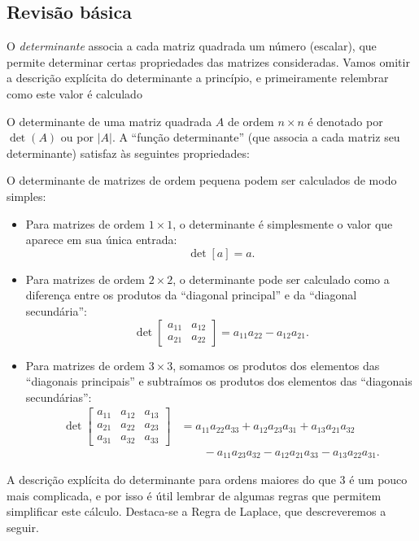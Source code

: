\subsection*{Revisão básica}

O \textit{determinante} associa a cada matriz quadrada um número (escalar), que permite determinar certas propriedades das matrizes consideradas. Vamos omitir a descrição explícita do determinante a princípio, e primeiramente relembrar como este valor é calculado

O determinante de uma matriz quadrada $A$ de ordem $n\times n$ é denotado por $\det(A)$ ou por $|A|$. A ``função determinante'' (que associa a cada matriz seu determinante) satisfaz às seguintes propriedades:

O determinante de matrizes de ordem pequena podem ser calculados de modo simples:

\begin{itemize}
	\item Para matrizes de ordem $1\times 1$, o determinante é simplesmente o valor que aparece em sua única entrada:
		\[\det[a]=a.\]
	\item Para matrizes de ordem $2\times 2$, o determinante pode ser calculado como a diferença entre os produtos da ``diagonal principal'' e da ``diagonal secundária'':
		\[\det\begin{bmatrix}
		a_{11}	& a_{12}\\a_{21}&a_{22}\end{bmatrix}=a_{11}a_{22}-a_{12}a_{21}.\]
	\item Para matrizes de ordem $3\times 3$, somamos os produtos dos elementos das ``diagonais principais'' e subtraímos os produtos dos elementos das ``diagonais secundárias'':
		\begin{align*}\det\begin{bmatrix}a_{11}&a_{12}&a_{13}\\a_{21}&a_{22}&a_{23}\\a_{31}&a_{32}&a_{33}\end{bmatrix}
		&=a_{11}a_{22}a_{33}+a_{12}a_{23}a_{31}+a_{13}a_{21}a_{32}\\
		&\qquad-a_{11}a_{23}a_{32}-a_{12}a_{21}a_{33}-a_{13}a_{22}a_{31}.
		\end{align*}
\end{itemize}

A descrição explícita do determinante para ordens maiores do que $3$ é um pouco mais complicada, e por isso é útil lembrar de algumas regras que permitem simplificar este cálculo. Destaca-se a Regra de Laplace, que descreveremos a seguir.

